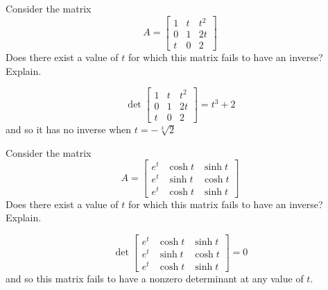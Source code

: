 \documentclass{ximera}
\begin{document}
\begin{problem}\label{prb:7.33} Consider the matrix
\begin{equation*}
A =
\left[
\begin{array}{rrr}
1 & t & t^{2} \\
0 & 1 & 2t \\
t & 0 & 2
\end{array}
\right]
\end{equation*}
Does there exist a value of $t$ for which this matrix fails to have an
inverse? Explain.
\begin{hint}
\[
\det \left[
\begin{array}{ccc}
1 & t & t^{2} \\
0 & 1 & 2t \\
t & 0 & 2
\end{array}
\right] = t^{3}+2
\]
and so it has no inverse when $t=-\sqrt[3]{2}$
\end{hint}
\end{problem}

\begin{problem}\label{prb:7.34} Consider the matrix
\begin{equation*}
A =
\left[
\begin{array}{ccc}
e^{t} & \cosh t & \sinh t \\
e^{t} & \sinh t & \cosh t \\
e^{t} & \cosh t & \sinh t
\end{array}
\right]
\end{equation*}
Does there exist a value of $t$ for which this matrix fails to have an
inverse? Explain.
\begin{hint}
\[
\det \left[
\begin{array}{ccc}
e^{t} & \cosh t & \sinh t \\
e^{t} & \sinh t & \cosh t \\
e^{t} & \cosh t & \sinh t
\end{array}
\right] = 0
\]
and so this matrix fails to have a nonzero determinant at any value of $t$.
\end{hint}
\end{problem}
\end{document}
